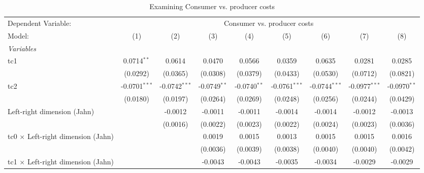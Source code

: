 
\begin{table}[htbp]
   \caption{Examining Consumer vs. producer costs}
   \centering
   \begin{tabular}{lcccccccc}
      \tabularnewline \midrule \midrule
      Dependent Variable: & \multicolumn{8}{c}{Consumer vs. producer costs}\\
      Model:                                    & (1)             & (2)             & (3)            & (4)            & (5)             & (6)             & (7)             & (8)\\  
      \midrule
      \emph{Variables}\\
      tc1                                       & 0.0714$^{**}$   & 0.0614          & 0.0470         & 0.0566         & 0.0359          & 0.0635          & 0.0281          & 0.0285\\   
                                                & (0.0292)        & (0.0365)        & (0.0308)       & (0.0379)       & (0.0433)        & (0.0530)        & (0.0712)        & (0.0821)\\   
      tc2                                       & -0.0701$^{***}$ & -0.0742$^{***}$ & -0.0749$^{**}$ & -0.0740$^{**}$ & -0.0761$^{***}$ & -0.0744$^{***}$ & -0.0977$^{***}$ & -0.0970$^{**}$\\   
                                                & (0.0180)        & (0.0197)        & (0.0264)       & (0.0269)       & (0.0248)        & (0.0256)        & (0.0244)        & (0.0429)\\   
      Left-right dimension (Jahn)               &                 & -0.0012         & -0.0011        & -0.0011        & -0.0014         & -0.0014         & -0.0012         & -0.0013\\   
                                                &                 & (0.0016)        & (0.0022)       & (0.0023)       & (0.0022)        & (0.0024)        & (0.0023)        & (0.0036)\\   
      tc0 $\times$ Left-right dimension (Jahn)  &                 &                 & 0.0019         & 0.0015         & 0.0013          & 0.0015          & 0.0015          & 0.0016\\   
                                                &                 &                 & (0.0036)       & (0.0039)       & (0.0038)        & (0.0040)        & (0.0040)        & (0.0042)\\   
      tc1 $\times$ Left-right dimension (Jahn)  &                 &                 & -0.0043        & -0.0043        & -0.0035         & -0.0034         & -0.0029         & -0.0029\\   

\end{tabular}
\end{table}

